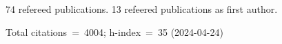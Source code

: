 74 refereed publications. 13 refeered publications as first author.

Total citations~=~4004; h-index~=~35 (2024-04-24)